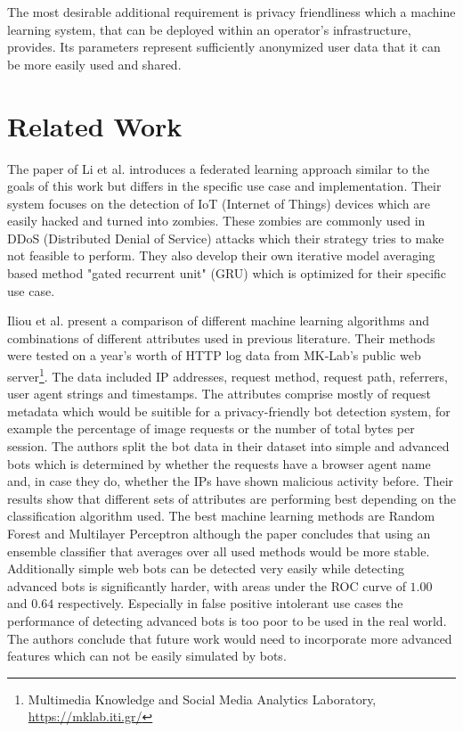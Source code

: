 \documentclass[
    fontsize=12pt,
    headings=small,
    parskip=half,           %
    bibliography=totoc,
    numbers=noenddot,       %
    open=any,               %
    final,                   %
    table
]{scrreprt}
\begin{document}
The most desirable additional requirement is privacy friendliness which a machine learning system, that can be deployed within an operator's infrastructure, provides. Its parameters represent sufficiently anonymized user data that it can be more easily used and shared.

\section{Related Work}

The paper of Li et al. \cite{LiJi2021} introduces a federated learning approach similar to the goals of this work but differs in the specific use case and implementation. Their system focuses on the detection of IoT (Internet of Things) devices which are easily hacked and turned into zombies. These zombies are commonly used in DDoS (Distributed Denial of Service) attacks which their strategy tries to make not feasible to perform. They also develop their own iterative model averaging based method "gated recurrent unit" (GRU) which is optimized for their specific use case.

Iliou et al. \cite{10.1145/3339252.3339267} present a comparison of different machine learning algorithms and combinations of different attributes used in previous literature. Their methods were tested on a year's worth of HTTP log data from MK-Lab's public web server\footnote{Multimedia Knowledge and Social Media Analytics Laboratory, \url{https://mklab.iti.gr/}}. The data included IP addresses, request method, request path, referrers, user agent strings and timestamps. The attributes comprise mostly of request metadata which would be suitible for a privacy-friendly bot detection system, for example the percentage of image requests or the number of total bytes per session. The authors split the bot data in their dataset into simple and advanced bots which is determined by whether the requests have a browser agent name and, in case they do, whether the IPs have shown malicious activity before. Their results show that different sets of attributes are performing best depending on the classification algorithm used. The best machine learning methods are Random Forest and Multilayer Perceptron although the paper concludes that using an ensemble classifier that averages over all used methods would be more stable. Additionally simple web bots can be detected very easily while detecting advanced bots is significantly harder, with areas under the ROC curve of $1.00$ and $0.64$ respectively. Especially in false positive intolerant use cases the performance of detecting advanced bots is too poor to be used in the real world. The authors conclude that future work would need to incorporate more advanced features which can not be easily simulated by bots.
\end{document}
